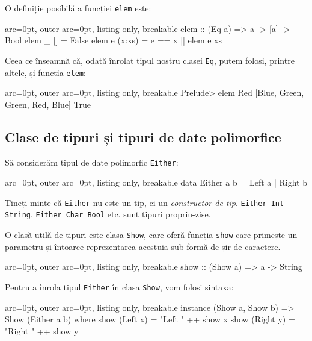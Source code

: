 O definiție posibilă a funcției \texttt{elem} este:


\begin{tcblisting}{ arc=0pt, outer arc=0pt, listing only, breakable}
elem :: (Eq a) => a -> [a] -> Bool
elem _ [] = False
elem e (x:xs) = e == x || elem e xs

\end{tcblisting}


Ceea ce înseamnă că, odată înrolat tipul nostru clasei \texttt{Eq}, putem folosi, printre altele, și functia \texttt{elem}:


\begin{tcblisting}{ arc=0pt, outer arc=0pt, listing only, breakable}
Prelude> elem Red [Blue, Green, Green, Red, Blue]
True

\end{tcblisting}



\subsection*{ Clase de tipuri și tipuri de date polimorfice }

Să considerăm tipul de date polimorfic \texttt{Either}:


\begin{tcblisting}{ arc=0pt, outer arc=0pt, listing only, breakable}
data Either a b = Left a | Right b

\end{tcblisting}


Țineți minte că \texttt{Either} nu este un tip, ci un \textit{constructor de tip}. \texttt{Either Int String}, \texttt{Either Char Bool} etc. sunt tipuri propriu-zise.

O clasă utilă de tipuri este clasa \texttt{Show}, care oferă funcția \texttt{show} care primește un parametru și întoarce reprezentarea acestuia sub formă de șir de caractere.


\begin{tcblisting}{ arc=0pt, outer arc=0pt, listing only, breakable}
show :: (Show a) => a -> String

\end{tcblisting}



Pentru a înrola tipul \texttt{Either} în clasa \texttt{Show}, vom folosi sintaxa:


\begin{tcblisting}{ arc=0pt, outer arc=0pt, listing only, breakable}
instance (Show a, Show b) => Show (Either a b) where
    show (Left x) = "Left " ++ show x
    show (Right y) = "Right " ++ show y

\end{tcblisting}


